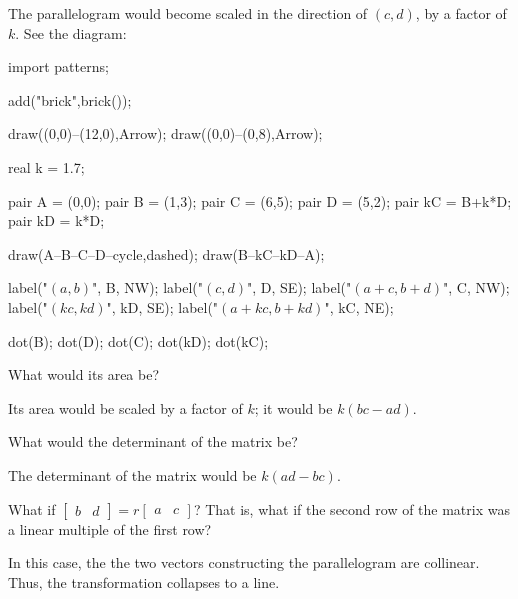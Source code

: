 \documentclass[../gatm_answers.tex]{subfiles}
\begin{document}
\begin{iinner_problem}
\begin{iinner_problem}
\begin{iinner_problem}
The parallelogram would become scaled in the direction of $(c,d)$, by a factor of $k$. See the diagram:

\begin{center}
	\begin{asy}[width=0.4\textwidth]
	import patterns;

	add("brick",brick());

	draw((0,0)--(12,0),Arrow);
	draw((0,0)--(0,8),Arrow);

	real k = 1.7;

	pair A = (0,0);
	pair B = (1,3);
	pair C = (6,5);
	pair D = (5,2);
	pair kC = B+k*D;
	pair kD = k*D;

	draw(A--B--C--D--cycle,dashed);
	draw(B--kC--kD--A);

	label("$(a,b)$", B, NW);
	label("$(c,d)$", D, SE);
	label("$(a+c,b+d)$", C, NW);
	label("$(kc,kd)$", kD, SE);
	label("$(a+kc,b+kd)$", kC, NE);

	dot(B);
	dot(D);
	dot(C);
	dot(kD);
	dot(kC);

	\end{asy}
\end{center}

\begin{iinner_problem}
\item What would its area be?
\end{iinner_problem}

Its area would be scaled by a factor of $k$; it would be $k(bc-ad)$.

\begin{iinner_problem}
\item What would the determinant of the matrix be?
\end{iinner_problem}

The determinant of the matrix would be $k(ad-bc)$.

\begin{iinner_problem}
\item What if $\left[\begin{smallmatrix}b & d \end{smallmatrix}\right]=r\left[\begin{smallmatrix}a & c \end{smallmatrix}\right]$? That is, what if the second row of the matrix was a linear multiple of the first row?
\end{iinner_problem}

In this case, the the two vectors constructing the parallelogram are collinear. Thus, the transformation collapses to a line.


\end{iinner_problem}
\end{iinner_problem}
\end{iinner_problem}
\end{document}
